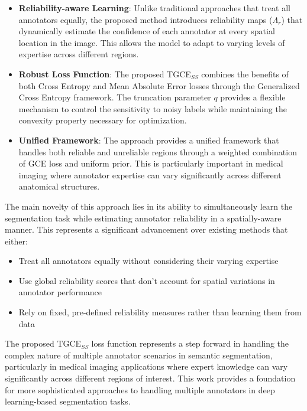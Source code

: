 \begin{itemize}
  \item \textbf{Reliability-aware Learning}: Unlike traditional
    approaches that treat all annotators equally, the proposed method
    introduces reliability maps ($\Lambda_r$) that dynamically
    estimate the confidence of each annotator at every spatial
    location in the image. This allows the model to adapt to varying
    levels of expertise across different regions.

  \item \textbf{Robust Loss Function}: The proposed TGCE$_{SS}$
    combines the benefits of both Cross Entropy and Mean Absolute
    Error losses through the Generalized Cross Entropy framework. The
    truncation parameter $q$ provides a flexible mechanism to control
    the sensitivity to noisy labels while maintaining the convexity
    property necessary for optimization.

  \item \textbf{Unified Framework}: The approach provides a unified
    framework that handles both reliable and unreliable regions
    through a weighted combination of GCE loss and uniform prior.
    This is particularly important in medical imaging where annotator
    expertise can vary significantly across different anatomical structures.
\end{itemize}

The main novelty of this approach lies in its ability to
simultaneously learn the segmentation task while estimating annotator
reliability in a spatially-aware manner. This represents a
significant advancement over existing methods that either:
\begin{itemize}
  \item Treat all annotators equally without considering their
    varying expertise
  \item Use global reliability scores that don't account for spatial
    variations in annotator performance
  \item Rely on fixed, pre-defined reliability measures rather than
    learning them from data
\end{itemize}

The proposed TGCE$_{SS}$ loss function represents a step forward in
handling the complex nature of multiple annotator scenarios in
semantic segmentation, particularly in medical imaging applications
where expert knowledge can vary significantly across different
regions of interest. This work provides a foundation for more
sophisticated approaches to handling multiple annotators in deep
learning-based segmentation tasks.
